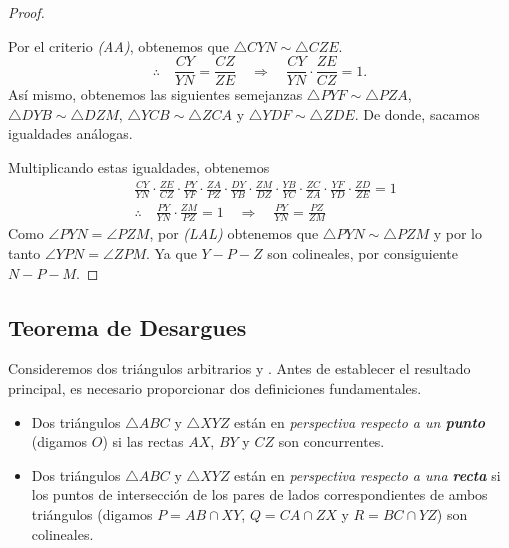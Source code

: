 \begin{proof}
    \begin{multicols}{2}
        \begin{figure}[H]
            \centering
            
        \end{figure}

        Por el criterio \textit{(AA)}, obtenemos que $\triangle CYN \sim \triangle CZE$.
        \[
            \therefore  \quad \frac{CY}{YN} = \frac{CZ}{ZE} \quad \Rightarrow \quad \frac{CY}{YN} \cdot \frac{ZE}{CZ} = 1.
        \]
        Así mismo, obtenemos las siguientes semejanzas $\triangle PYF \sim \triangle PZA$, $\triangle DYB \sim \triangle DZM$, $\triangle YCB \sim \triangle ZCA$ y $\triangle YDF \sim \triangle ZDE$.
        De donde, sacamos igualdades análogas.
    \end{multicols}

    Multiplicando estas igualdades, obtenemos
    \begin{align*}
        &\frac{CY}{YN} \cdot \frac{ZE}{CZ} \cdot \frac{PY}{YF} \cdot \frac{ZA}{PZ} \cdot \frac{DY}{YB} \cdot \frac{ZM}{DZ} \cdot \frac{YB}{YC} \cdot \frac{ZC}{ZA} \cdot \frac{YF}{YD} \cdot \frac{ZD}{ZE} = 1\\[3mm]
        &\therefore \quad \frac{PY}{YN} \cdot \frac{ZM}{PZ} = 1 \quad \Rightarrow \quad \frac{PY}{YN} = \frac{PZ}{ZM}
    \end{align*}
    Como $\angle PYN = \angle PZM$, por \textit{(LAL)} obtenemos que $\triangle PYN \sim \triangle PZM$ y por lo tanto $\angle YPN = \angle ZPM$.
    Ya que $Y - P - Z$ son colineales, por consiguiente $N - P - M$.
\end{proof}




\subsection{Teorema de Desargues}

Consideremos dos triángulos arbitrarios  y .
Antes de establecer el resultado principal, es necesario proporcionar dos definiciones fundamentales.

\begin{section-definition.tcb}{}{}
    \begin{itemize}
        \item Dos triángulos $\triangle ABC$ y $\triangle XYZ$ están en \textit{perspectiva respecto a un \textbf{punto}} (digamos $O$) si las rectas $AX$, $BY$ y $CZ$ son concurrentes.
        \item Dos triángulos $\triangle ABC$ y $\triangle XYZ$ están en \textit{perspectiva respecto a una \textbf{recta}} si los puntos de intersección de los pares de lados correspondientes de ambos triángulos (digamos $P = AB \cap XY$, $Q = CA \cap ZX$ y $R = BC \cap YZ$) son colineales.
    \end{itemize}
\end{section-definition.tcb}

